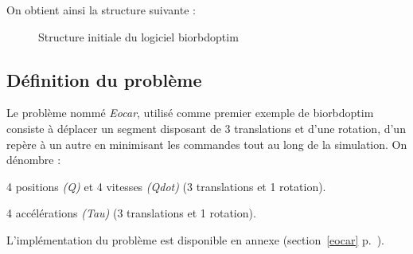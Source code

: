 On obtient ainsi la structure suivante :
 

\begin{figure}[h]
\caption{Structure initiale du logiciel \gls{biorbdoptim}}
\end{figure}



            \subsection{Définition du problème}

Le problème nommé \emph{Eocar}, utilisé comme premier exemple de \gls{biorbdoptim} consiste à déplacer un segment disposant de 3 translations et d'une rotation, d'un repère à un autre en minimisant les commandes tout au long de la simulation. On dénombre :


\begin{description}
\setlength\itemsep{-0.5em}
\item[8 états \emph{(X)} :] 4 positions \emph{(Q)} et 4 vitesses \emph{(Qdot)} (3 translations et 1 rotation).
\item[4 commandes \emph{(U)} :] 4 accélérations \emph{(Tau)} (3 translations et 1 rotation).
\end{description}

L'implémentation du problème est disponible en annexe (section~\ref{eocar} p.~\pageref{eocar}).

